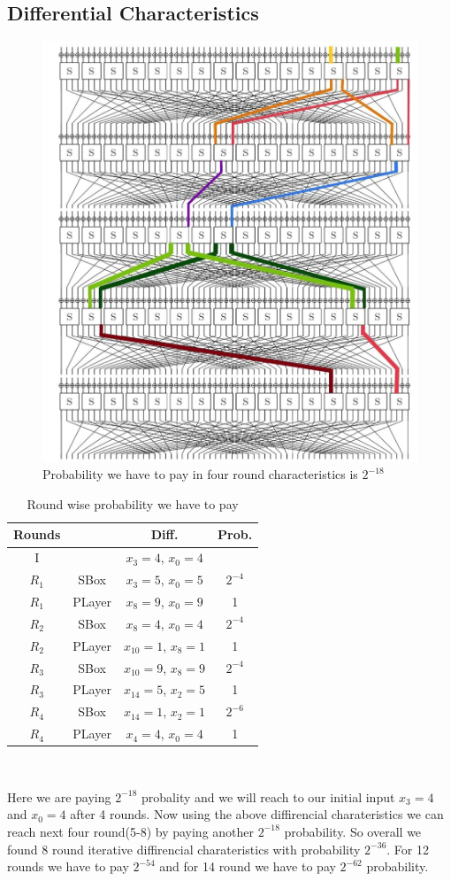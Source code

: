 \documentclass[journal=tosc,preprint]{iacrtrans}
\begin{document}
\subsection{Differential Characteristics}
\begin{figure}[h!]
	\centering
	\includegraphics[width=0.6\linewidth, height=0.5\textheight]{IMG_20211114_110332}
	\caption{Probability we have to pay in four round characteristics is $2^{-18}$}
	\label{fig:img20211114110332}
\end{figure}
\newpage
\begin{table}[h!]
	\caption{Round wise probability we have to pay}
	\centering
	\begin{tabular}{ |c||c|c|c| }
		\hline
		Rounds & & Diff. & Prob. \\ \hline \hline
		I& & $x_3 = 4$, $x_0 = 4$ &  \\ 
		$R_1$& SBox & $x_3 = 5$, $x_{0} = 5$ & $2^{-4}$ \\
		$R_1$& PLayer & $x_8 = 9$, $x_{0} = 9$ & 1 \\
		$R_2$& SBox & $x_8 = 4$, $x_{0} = 4$ & $2^{-4}$ \\
		$R_2$& PLayer & $x_{10} = 1$, $x_{8} = 1$ & 1 \\
		$R_3$& SBox & $x_{10} = 9$, $x_{8} = 9$ & $2^{-4}$ \\
		$R_3$& PLayer & $x_{14} = 5$, $x_{2} = 5$ & 1 \\
		$R_4$& SBox & $x_{14} = 1$, $x_{2} = 1$  & $2^{-6}$ \\
		$R_4$& PLayer & $x_4 = 4$, $x_0 = 4$ & 1 \\ \hline
	\end{tabular}\\
\end{table}
Here we are paying $2^{-18}$ probality and we will reach to our initial input $x_3 = 4$ and $x_0 = 4$ after 4 rounds. Now using the above diffirencial charateristics we can reach next four round(5-8) by paying another $2^{-18}$ probability. So overall we found 8 round iterative diffirencial charateristics with probability $2^{-36}$. For 12 rounds we have to pay $2^{-54}$ and for 14 round we have to pay $2^{-62}$ probability.
\end{document}
